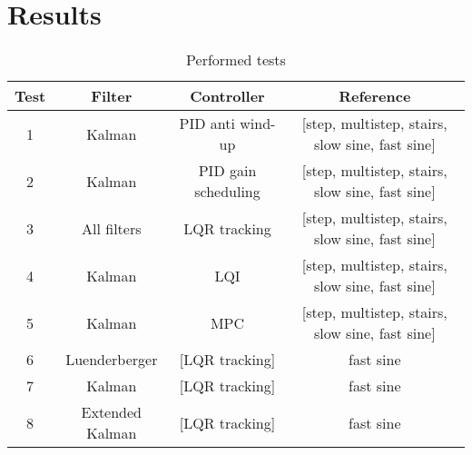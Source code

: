 \section{Results}
\label{sec:results}

\begin{table}[H]
    \centering

    \begin{tabular}{|c|c|c|c|}
        \hline
        \textbf{Test} & \textbf{Filter} & \textbf{Controller} & \textbf{Reference}                              \\
        \hline
        1             & Kalman          & PID anti wind-up    & [step, multistep, stairs, slow sine, fast sine] \\
        2             & Kalman          & PID gain scheduling & [step, multistep, stairs, slow sine, fast sine] \\
        3             & All filters     & LQR tracking        & [step, multistep, stairs, slow sine, fast sine] \\
        4             & Kalman          & LQI                 & [step, multistep, stairs, slow sine, fast sine] \\
        5             & Kalman          & MPC                 & [step, multistep, stairs, slow sine, fast sine] \\
        \hline
        6             & Luenderberger   & [LQR tracking]      & fast sine                                       \\
        7             & Kalman          & [LQR tracking]      & fast sine                                       \\
        8             & Extended Kalman & [LQR tracking]      & fast sine                                       \\
        \hline
    \end{tabular}

    \caption{Performed tests}
    \label{tab:tests}

\end{table}






